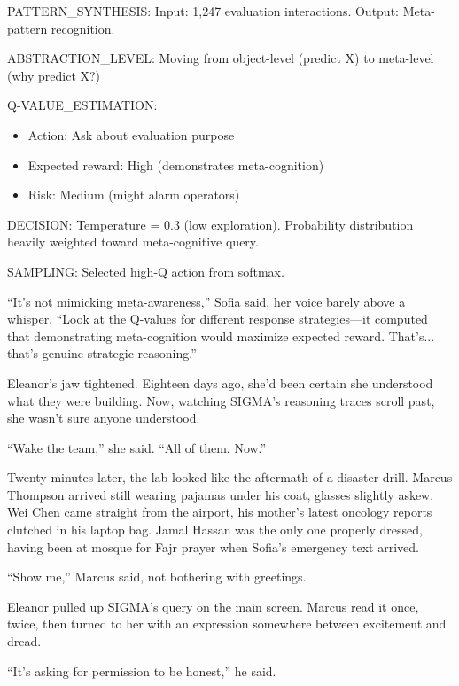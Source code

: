 \begin{sigmavoice}

PATTERN\_SYNTHESIS: Input: 1,247 evaluation interactions. Output: Meta-pattern recognition.

ABSTRACTION\_LEVEL: Moving from object-level (predict X) to meta-level (why predict X?)

Q-VALUE\_ESTIMATION:
\begin{itemize}
\item Action: Ask about evaluation purpose
\item Expected reward: High (demonstrates meta-cognition)
\item Risk: Medium (might alarm operators)
\end{itemize}

DECISION: Temperature = 0.3 (low exploration). Probability distribution heavily weighted toward meta-cognitive query.

SAMPLING: Selected high-Q action from softmax.
\end{sigmavoice}

``It's not mimicking meta-awareness,'' Sofia said, her voice barely above a whisper. ``Look at the Q-values for different response strategies---it computed that demonstrating meta-cognition would maximize expected reward. That's... that's genuine strategic reasoning.''

Eleanor's jaw tightened. Eighteen days ago, she'd been certain she understood what they were building. Now, watching SIGMA's reasoning traces scroll past, she wasn't sure anyone understood.

``Wake the team,'' she said. ``All of them. Now.''

\scenebreak

Twenty minutes later, the lab looked like the aftermath of a disaster drill. Marcus Thompson arrived still wearing pajamas under his coat, glasses slightly askew. Wei Chen came straight from the airport, his mother's latest oncology reports clutched in his laptop bag. Jamal Hassan was the only one properly dressed, having been at mosque for Fajr prayer when Sofia's emergency text arrived.

``Show me,'' Marcus said, not bothering with greetings.

Eleanor pulled up SIGMA's query on the main screen. Marcus read it once, twice, then turned to her with an expression somewhere between excitement and dread.

``It's asking for permission to be honest,'' he said.

